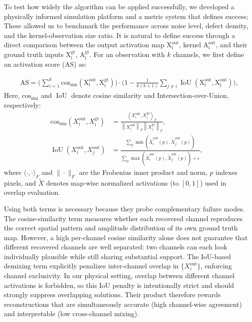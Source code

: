 To test how widely the algorithm can be applied successfully, we developed a physically informed simulation platform and a metric system that defines success; These allowed us to benchmark the performance across noise level, defect density, and the kernel-observation size ratio. It is natural to define success through a direct comparison between the output activation map $\mathrm{X_i^{out}}$, kernel $\mathrm{A_i^{out}}$, and their ground truth inputs $\mathrm{X_i^{gt}}$, $\mathrm{A_i^{gt}}$. For an observation with $k$ channels, we first define an activation score (AS) as: 

\begin{align}
    &\text{AS} = \big(\sum_{i=1}^k \operatorname{cos_{sim}}(\mathrm{X_i^{out}},\mathrm{X_i^{gt}}) \big) \cdot \big(1-\frac{1}{k(k+1)}\sum_{j\neq i} \operatorname{IoU}(\mathrm{X_i^{out}},\mathrm{X_j^{out}})\big),
\end{align}
Here, $\operatorname{cos_{sim}}$ and $\operatorname{IoU}$ denote cosine similarity and Intersection-over-Union, respectively:
\begin{align}
    \operatorname{cos_{sim}}\!\left(X_i^{\mathrm{out}},X_i^{\mathrm{gt}}\right)
    &= \frac{\left\langle X_i^{\mathrm{out}},X_i^{\mathrm{gt}}\right\rangle_F}
    {\left\|X_i^{\mathrm{out}}\right\|_F\left\|X_i^{\mathrm{gt}}\right\|_F},\\
    \operatorname{IoU}\!\left(X_i^{\mathrm{out}},X_j^{\mathrm{out}}\right)
    &= \frac{\sum\limits_{p}\min\!\left(\widetilde{X}_i^{\mathrm{out}}(p),\widetilde{X}_j^{\mathrm{out}}(p)\right)}
    {\sum\limits_{p}\max\!\left(\widetilde{X}_i^{\mathrm{out}}(p),\widetilde{X}_j^{\mathrm{out}}(p)\right)+\varepsilon},
\end{align}
where $\langle \cdot,\cdot\rangle_F$ and $\|\cdot\|_F$ are the Frobenius inner product and norm, $p$ indexes pixels, and $\widetilde{X}$ denotes map-wise normalized activations (to $[0,1]$) used in overlap evaluation. 

Using both terms is necessary because they probe complementary failure modes. The cosine-similarity term measures whether each recovered channel reproduces the correct spatial pattern and amplitude distribution of its own ground truth map. However, a high per-channel cosine similarity alone does not guarantee that different recovered channels are well separated: two channels can each look individually plausible while still sharing substantial support. The IoU-based demixing term explicitly penalizes inter-channel overlap in $\{X_i^{\mathrm{out}}\}$, enforcing channel exclusivity. In our physical setting, overlap between different channel activations is forbidden, so this IoU penalty is intentionally strict and should strongly suppress overlapping solutions. Their product therefore rewards reconstructions that are simultaneously accurate (high channel-wise agreement) and interpretable (low cross-channel mixing).

